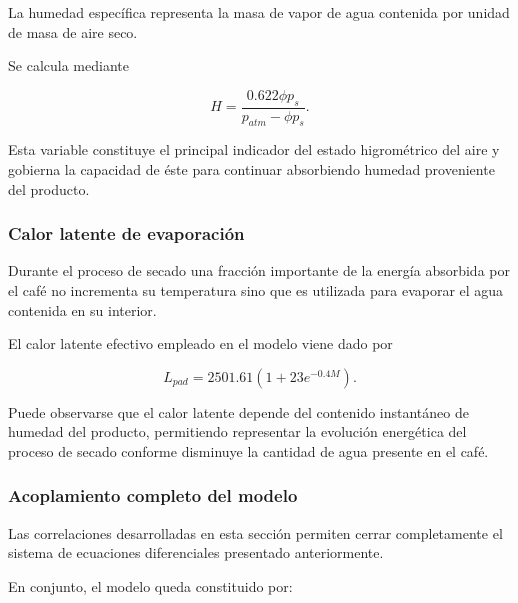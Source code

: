 La humedad específica representa la masa de vapor de agua contenida por unidad de masa de aire seco.

Se calcula mediante

\begin{equation}
H
=
\frac
{0.622\phi p_s}
{p_{atm}-\phi p_s}.
\end{equation}

Esta variable constituye el principal indicador del estado higrométrico del aire y gobierna la capacidad de éste para continuar absorbiendo humedad proveniente del producto.

\subsubsection{Calor latente de evaporación}

Durante el proceso de secado una fracción importante de la energía absorbida por el café no incrementa su temperatura sino que es utilizada para evaporar el agua contenida en su interior.

El calor latente efectivo empleado en el modelo viene dado por

\begin{equation}
L_{pad}
=
2501.61
\left(
1+23e^{-0.4M}
\right).
\end{equation}

Puede observarse que el calor latente depende del contenido instantáneo de humedad del producto, permitiendo representar la evolución energética del proceso de secado conforme disminuye la cantidad de agua presente en el café.

\subsubsection{Acoplamiento completo del modelo}

Las correlaciones desarrolladas en esta sección permiten cerrar completamente el sistema de ecuaciones diferenciales presentado anteriormente.

En conjunto, el modelo queda constituido por:

